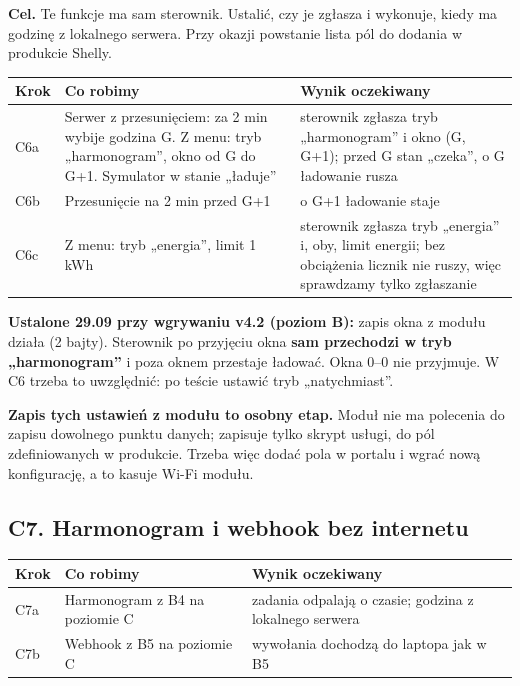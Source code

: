 \documentclass[11pt,a4paper]{article}
\begin{document}
\textbf{Cel.} Te funkcje ma sam sterownik. Ustalić, czy je zgłasza i wykonuje, kiedy ma godzinę z lokalnego serwera. Przy okazji powstanie lista pól do dodania w produkcie Shelly.


\begin{longtable}{>{\raggedright\arraybackslash}p{3.00cm}>{\raggedright\arraybackslash}p{5.57cm}>{\raggedright\arraybackslash}p{6.71cm}}
\toprule
\rowcolor{apteallight}\textbf{Krok} & \textbf{Co robimy} & \textbf{Wynik oczekiwany} \\
\midrule\endhead
\bottomrule\endfoot
C6a & Serwer z przesunięciem: za 2 min wybije godzina G. Z menu: tryb „harmonogram”, okno od G do G+1. Symulator w stanie „ładuje” & sterownik zgłasza tryb „harmonogram” i okno (G, G+1); przed G stan „czeka”, o G ładowanie rusza \\
C6b & Przesunięcie na 2 min przed G+1 & o G+1 ładowanie staje \\
C6c & Z menu: tryb „energia”, limit 1 kWh & sterownik zgłasza tryb „energia” i, oby, limit energii; bez obciążenia licznik nie ruszy, więc sprawdzamy tylko zgłaszanie \\
\end{longtable}

\textbf{Ustalone 29.09 przy wgrywaniu v4.2 (poziom B):} zapis okna z modułu działa (2 bajty). Sterownik po przyjęciu okna \textbf{sam przechodzi w tryb „harmonogram”} i poza oknem przestaje ładować. Okna 0–0 nie przyjmuje. W C6 trzeba to uwzględnić: po teście ustawić tryb „natychmiast”.


\textbf{Zapis tych ustawień z modułu to osobny etap.} Moduł nie ma polecenia do zapisu dowolnego punktu danych; zapisuje tylko skrypt usługi, do pól zdefiniowanych w produkcie. Trzeba więc dodać pola w portalu i wgrać nową konfigurację, a to kasuje Wi-Fi modułu.


\subsection{C7. Harmonogram i webhook bez internetu}

\begin{longtable}{>{\raggedright\arraybackslash}p{3.00cm}>{\raggedright\arraybackslash}p{4.61cm}>{\raggedright\arraybackslash}p{7.67cm}}
\toprule
\rowcolor{apteallight}\textbf{Krok} & \textbf{Co robimy} & \textbf{Wynik oczekiwany} \\
\midrule\endhead
\bottomrule\endfoot
C7a & Harmonogram z B4 na poziomie C & zadania odpalają o czasie; godzina z lokalnego serwera \\
C7b & Webhook z B5 na poziomie C & wywołania dochodzą do laptopa jak w B5 \\
\end{longtable}
\end{document}
